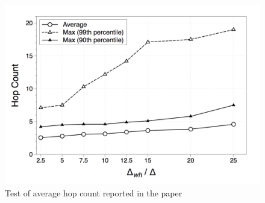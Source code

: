 \begin{figure}[ht]
  \centering
  \includegraphics[keepaspectratio=true, width=\textwidth]{images/paper_average_hop_count}\caption{Test of average hop count reported in the paper}
  \label{fig:paper_average_hop_count}
\end{figure}


